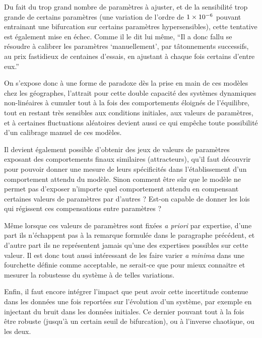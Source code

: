 Du fait du trop grand nombre de paramètres à ajuster, et de la sensibilité trop grande de certains paramètres (une variation de l'ordre de $\SI{1E-6}{}$ pouvant entrainant une bifurcation sur certains paramètres hypersensibles), cette tentative est également mise en échec. Comme il le dit lui même, \enquote{Il a donc fallu se résoudre à calibrer les paramètres \enquote{manuellement}, par tâtonnements successifs, au prix fastidieux de centaines d'essais, en ajustant à chaque fois certains d'entre eux.}  %

On s'expose donc à une forme de paradoxe dès la prise en main de ces modèles chez les géographes, l'attrait pour cette double capacité des systèmes dynamiques non-linéaires à cumuler tout à la fois des comportements éloignés de l'équilibre, tout en restant très sensibles aux conditions initiales, aux valeurs de paramètres, et à certaines fluctuations aléatoires devient aussi ce qui empêche toute possibilité d'un calibrage manuel de ces modèles.

Il devient également possible d'obtenir des jeux de valeurs de paramètres exposant des comportements finaux similaires (attracteurs), qu'il faut découvrir pour pouvoir donner une mesure de leurs spécificités dans l'établissement d'un comportement attendu du modèle. Sinon comment être sûr que le modèle ne permet pas d'exposer n'importe quel comportement attendu en compensant certaines valeurs de paramètres par d'autres ? Est-on capable de donner les lois qui régissent ces compensations entre paramètres ?

Même lorsque ces valeurs de paramètres sont fixées \textit{a priori} par expertise, d'une part ils n'échappent pas à la remarque formulée dans le paragraphe précédent, et d'autre part ils ne représentent jamais qu'une des expertises possibles sur cette valeur. Il est donc tout aussi intéressant de les faire varier \textit{a minima} dans une fourchette définie comme acceptable, ne serait-ce que pour mieux connaitre et mesurer la robustesse du système à de telles variations.

Enfin, il faut encore intégrer l'impact que peut avoir cette incertitude contenue dans les données une fois reportées sur l'évolution d'un système, par exemple en injectant du bruit dans les données initiales. Ce dernier pouvant tout à la fois être robuste (jusqu'à un certain seuil de bifurcation), ou à l'inverse chaotique, ou les deux.

